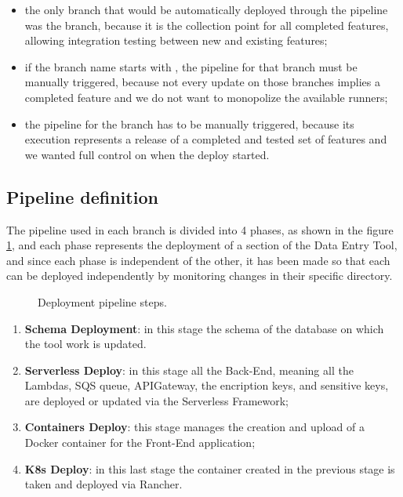 \begin{itemize}
    \item the only branch that would be automatically deployed through the pipeline was the  branch, because it is the collection point for all completed features, allowing integration testing between new and existing features;
    \item  if the branch name starts with , the pipeline for that branch must be manually triggered, because not every update on those branches implies a completed feature and we do not want to monopolize the available runners;
    \item the pipeline for the  branch has to be manually triggered, because its execution represents a release of a completed and tested set of features and we wanted full control on when the deploy started.
\end{itemize}


\subsection{Pipeline definition}
The pipeline used in each branch is divided into 4 phases, as shown in the figure \ref{fig:pipe}, and each phase represents the deployment of a section of the Data Entry Tool, and since each phase is independent of the other, it has been made so that each can be deployed independently by monitoring changes in their specific directory.

\begin{figure}[!htb]
  \centering
  \caption{Deployment pipeline steps.}
  \label{fig:pipe}
\end{figure}

\begin{enumerate}
    \item \textbf{Schema Deployment}: in this stage the schema of the database on which the tool work is updated. 
    \item \textbf{Serverless Deploy}: in this stage all the Back-End, meaning all the Lambdas, SQS queue, APIGateway, the encription keys, and sensitive keys, are deployed or updated via the Serverless Framework;
    \item \textbf{Containers Deploy}: this stage manages the creation and upload of a Docker container for the Front-End application;
    \item \textbf{K8s Deploy}: in this last stage the container created in the previous stage is taken and deployed via Rancher.
\end{enumerate}

